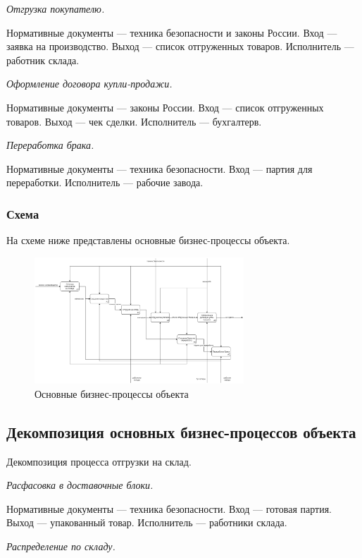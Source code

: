 	\emph{Отгрузка покупателю.}

	Нормативные документы --- техника безопасности и законы России.  Вход --- заявка на производство.  Выход --- список отгруженных товаров.  Исполнитель --- работник склада.

	\emph{Оформление договора купли-продажи.}

	Нормативные документы --- законы России.  Вход --- список отгруженных товаров.  Выход --- чек сделки.  Исполнитель --- бухгалтерв.

	\emph{Переработка брака.}

	Нормативные документы --- техника безопасности.  Вход --- партия для переработки.  Исполнитель --- рабочие завода.

\newpage
\subsubsection{Схема}

На схеме ниже представлены основные бизнес-процессы объекта.

\begin{figure}[h!]
        \centering
        \includegraphics[width=0.7\textwidth]{images/3/business.eps}
	\caption{Основные бизнес-процессы объекта}
\end{figure}

\subsection{Декомпозиция основных бизнес-процессов объекта}

Декомпозиция процесса отгрузки на склад.

\emph{Расфасовка в доставочные блоки.}

Нормативные документы --- техника безопасности.  Вход --- готовая партия.  Выход --- упакованный товар.  Исполнитель --- работники склада.

\emph{Распределение по складу.}

